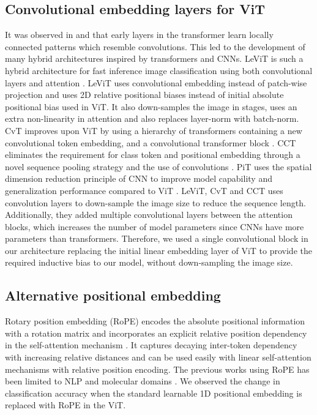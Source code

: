 \documentclass{article}
\begin{document}
\subsection{Convolutional embedding layers for ViT}

It was observed in \cite{child2019generating} and \cite{dosovitskiy2021image} that early layers in the transformer learn locally connected patterns which resemble convolutions. This led to the development of many hybrid architectures inspired by transformers and CNNs. LeViT is such a hybrid architecture for fast inference image classification using both convolutional layers and attention \cite{graham2021levit}. LeViT uses convolutional embedding instead of patch-wise projection and uses 2D relative positional biases instead of initial absolute positional bias used in ViT. It also down-samples the image in stages, uses an extra non-linearity in attention and also replaces layer-norm with batch-norm. CvT improves upon ViT by using a hierarchy of transformers containing a new convolutional token embedding, and a convolutional transformer block \cite{wu2021cvt}. CCT eliminates the requirement for class token and positional embedding through a novel sequence pooling strategy and the use of convolutions \cite{hassani2021escaping}. PiT uses the spatial dimension reduction principle of CNN to improve model capability and generalization performance compared to ViT \cite{heo2021rethinking}. LeViT, CvT and CCT uses convolution layers to down-sample the image size to reduce the sequence length. Additionally, they added multiple convolutional layers between the attention blocks, which increases the number of model parameters since CNNs have more parameters than transformers. Therefore, we used a single convolutional block in our architecture replacing the initial linear embedding layer of ViT to provide the required inductive bias to our model, without down-sampling the image size. 



\subsection{Alternative positional embedding}

Rotary position embedding (RoPE) encodes the absolute positional information with a rotation matrix and incorporates an explicit relative position dependency in the self-attention mechanism \cite{su2021roformer}. It captures decaying inter-token dependency with increasing relative distances and can be used easily with linear self-attention mechanisms with relative position encoding. The previous works using RoPE has been limited to NLP and molecular domains \cite{ross2021large}. We observed the change in classification accuracy when the standard learnable 1D positional embedding is replaced with RoPE in the ViT. 
\end{document}
